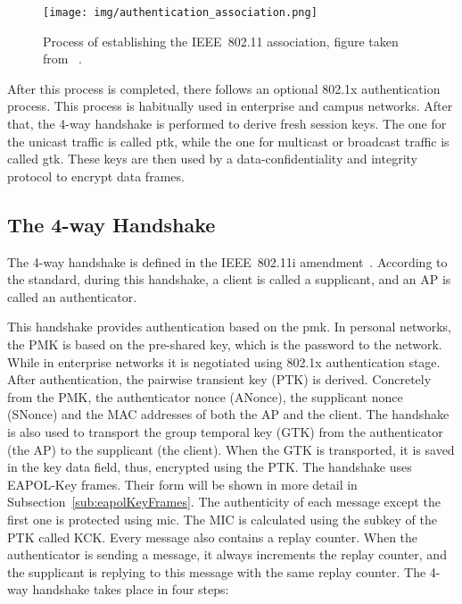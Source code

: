 \begin{figure}[h!]
  \centering
  \texttt{[image: img/authentication\_association.png]}
  \caption[Process of establishing the IEEE~802.11 association]{Process of establishing the IEEE~802.11 association, figure taken from ~\cite{ieee802.11i_2004}.}
  \label{fig:association}
\end{figure}

After this process is completed, there follows an optional 802.1x authentication process. This process is habitually used in enterprise and campus networks. After that, the 4-way handshake is performed to derive fresh session keys. The one for the unicast traffic is called \gls{ptk}, while the one for multicast or broadcast traffic is called \gls{gtk}. These keys are then used by a data-confidentiality and integrity protocol to encrypt data frames. 

\subsection{The 4-way Handshake}
\label{sub:fourWayHandshake}
The 4-way handshake is defined in the IEEE~802.11i amendment~\cite{ieee802.11i_2004}. According to the standard, during this handshake, a client is called a supplicant, and an AP is called an authenticator.

This handshake provides authentication based on the \gls{pmk}. In personal networks, the PMK is based on the pre-shared key, which is the password to the network. While in enterprise networks it is negotiated using 802.1x authentication stage. After authentication, the pairwise transient key (PTK) is derived. Concretely from the PMK, the authenticator nonce (ANonce), the supplicant nonce (SNonce) and the MAC addresses of both the AP and the client. The handshake is also used to transport the group temporal key (GTK) from the authenticator (the AP) to the supplicant (the client). When the GTK is transported, it is saved in the key data field, thus, encrypted using the PTK. The handshake uses EAPOL-Key frames. Their form will be shown in more detail in Subsection~\ref{sub:eapolKeyFrames}. The authenticity of each message except the first one is protected using \gls{mic}. The MIC is calculated using the subkey of the PTK called KCK. Every message also contains a replay counter. When the authenticator is sending a message, it always increments the replay counter, and the supplicant is replying to this message with the same replay counter.
The 4-way handshake takes place in four steps:

